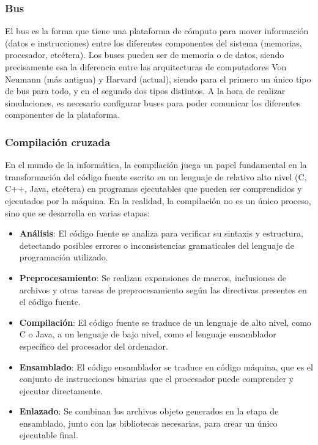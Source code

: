 \subsubsection{Bus}
\label{subs:bus}
El bus es la forma que tiene una plataforma de cómputo para mover información (datos e instrucciones) entre los diferentes componentes del sistema (memorias, procesador, etcétera). Los buses pueden ser de memoria o de datos, siendo precisamente esa la diferencia entre las arquitecturas de computadores Von Neumann (más antigua) y Harvard (actual), siendo para el primero un único tipo de bus para todo, y en el segundo dos tipos distintos. A la hora de realizar simulaciones, es necesario configurar buses para poder comunicar los diferentes componentes de la plataforma. 

\subsubsection{Compilación cruzada}

  En el mundo de la informática, la compilación juega un papel fundamental en la transformación del código fuente escrito en un lenguaje de relativo alto nivel (C, C++, Java, etcétera) en programas ejecutables que pueden ser comprendidos y ejecutados por la máquina. En la realidad, la compilación no es un único proceso, sino que se desarrolla en varias etapas:

  \begin{itemize}
    \item \textbf{Análisis}: El código fuente se analiza para verificar su sintaxis y estructura, detectando posibles errores o inconsistencias gramaticales del lenguaje de programación utilizado.
    \item \textbf{Preprocesamiento}: Se realizan expansiones de macros, inclusiones de archivos y otras tareas de preprocesamiento según las directivas presentes en el código fuente.
    \item \textbf{Compilación}: El código fuente se traduce de un lenguaje de alto nivel, como C o Java, a un lenguaje de bajo nivel, como el lenguaje ensamblador específico del procesador del ordenador.
    \item \textbf{Ensamblado}: El código ensamblador se traduce en código máquina, que es el conjunto de instrucciones binarias que el procesador puede comprender y ejecutar directamente.
    \item \textbf{Enlazado}: Se combinan los archivos objeto generados en la etapa de ensamblado, junto con las bibliotecas necesarias, para crear un único ejecutable final.
  \end{itemize}


